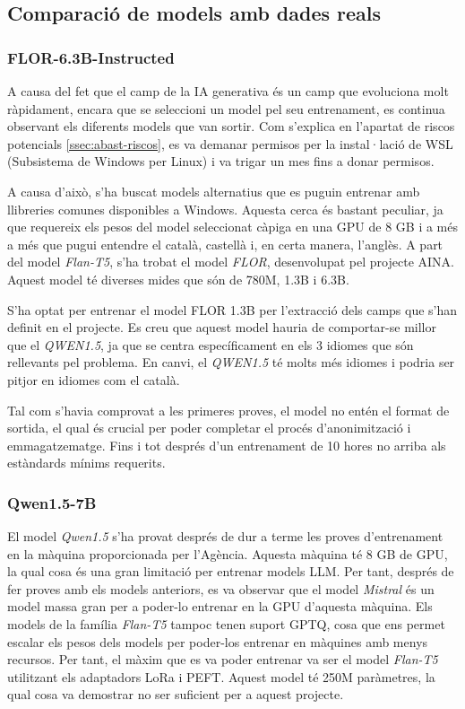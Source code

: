 \subsection{Comparació de models amb dades reals}

\subsubsection{FLOR-6.3B-Instructed}
A causa del fet que el camp de la IA generativa és un camp que evoluciona molt ràpidament, encara que se seleccioni un model pel seu entrenament, es continua observant els diferents models que van sortir. Com s'explica en l'apartat de riscos potencials \ref{ssec:abast-riscos}, es va demanar permisos per la instal·lació de WSL (Subsistema de Windows per Linux) i va trigar un mes fins a donar permisos.

A causa d'això, s'ha buscat models alternatius que es puguin entrenar amb llibreries comunes disponibles a Windows. Aquesta cerca és bastant peculiar, ja que requereix els pesos del model seleccionat càpiga en una GPU de 8 GB i a més a més que pugui entendre el català, castellà i, en certa manera, l'anglès. A part del model \textit{Flan-T5}, s'ha trobat el model \textit{FLOR}, desenvolupat pel projecte AINA. Aquest model té diverses mides que són de 780M, 1.3B i 6.3B.

S'ha optat per entrenar el model FLOR 1.3B per l'extracció dels camps que s'han definit en el projecte. Es creu que aquest model hauria de comportar-se millor que el \textit{QWEN1.5}, ja que se centra específicament en els 3 idiomes que són rellevants pel problema. En canvi, el \textit{QWEN1.5} té molts més idiomes i podria ser pitjor en idiomes com el català.

Tal com s'havia comprovat a les primeres proves, el model no entén el format de sortida, el qual és crucial per poder completar el procés d'anonimització i emmagatzematge. Fins i tot després d'un entrenament de 10 hores no arriba als estàndards mínims requerits.

\subsubsection{Qwen1.5-7B}
El model \textit{Qwen1.5} s'ha provat després de dur a terme les proves d'entrenament en la màquina proporcionada per l'Agència. Aquesta màquina té 8 GB de GPU, la qual cosa és una gran limitació per entrenar models LLM. Per tant, després de fer proves amb els models anteriors, es va observar que el model \textit{Mistral} és un model massa gran per a poder-lo entrenar en la GPU d'aquesta màquina. Els models de la família \textit{Flan-T5} tampoc tenen suport GPTQ, cosa que ens permet escalar els pesos dels models per poder-los entrenar en màquines amb menys recursos. Per tant, el màxim que es va poder entrenar va ser el model \textit{Flan-T5} utilitzant els adaptadors LoRa i PEFT. Aquest model té 250M paràmetres, la qual cosa va demostrar no ser suficient per a aquest projecte.

